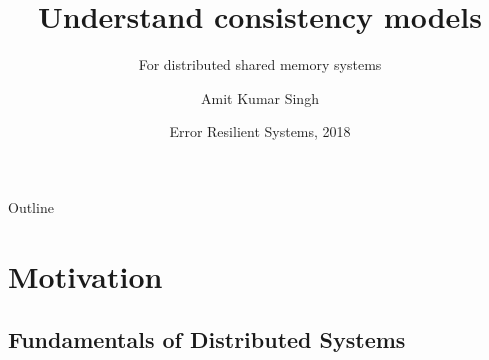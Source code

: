 \documentclass{beamer}
\title[Focus:Causal Consistency] %
{Understand consistency models}
\subtitle
{For distributed shared memory systems}
\author[Amit Kumar Singh] %
{Amit Kumar Singh}
\institute[Universities of Somewhere and Elsewhere] %
{

  Department of Computer Science\\
  University of British Columbia
}
\date[EECE513 2018] %
{Error Resilient Systems, 2018}
\begin{document}
\begin{frame}
  \titlepage

\end{frame}

\begin{frame}{Outline}
  \tableofcontents
\end{frame}





\section{Motivation}

\subsection{Fundamentals of Distributed Systems}
\end{document}
